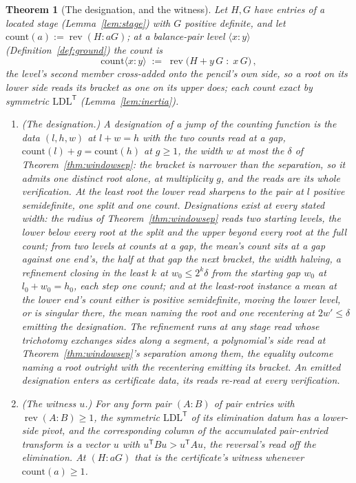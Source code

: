\documentclass[11pt]{article}
\newtheorem{theorem}{Theorem}
\theoremstyle{definition}
\begin{document}
\begin{theorem}[The designation, and the witness]
\label{thm:certconstruct}
Let $H,G$ have entries of a located stage
(Lemma~\ref{lem:stage}) with $G$ positive definite, and let $\mathrm{count}(a):=
\operatorname{rev}(H\!:\!aG)$; at a balance-pair level
$\langle x\!:\!y\rangle$ (Definition~\ref{def:ground}) the count is
\[
\mathrm{count}\langle x\!:\!y\rangle\;:=\;
\operatorname{rev}\big(H+y\,G\;:\;x\,G\big)\,,
\]
the level's second member cross-added onto the pencil's own side, so
a root on its lower side reads its bracket as one on its upper does; each
count exact by symmetric $\mathrm{LDL}^{\mathsf T}$
(Lemma~\ref{lem:inertia}).
\begin{enumerate}[leftmargin=2em,itemsep=1pt]
\item \emph{(The designation.)} A \emph{designation} of a jump of
the counting function is the data $(l,h,w)$ at $l+w=h$ with the two
counts read at a gap, $\mathrm{count}(l)+g=\mathrm{count}(h)$ at
$g\ge1$, the width $w$ at most the $\delta$ of
Theorem~\ref{thm:windowsep}: the bracket is narrower than the
separation, so it admits one distinct root alone, at multiplicity
$g$, and the reads are its whole verification. At the least root the
lower read sharpens to the pair at $l$ positive semidefinite, one
split and one count. Designations exist at every stated width: the
radius of Theorem~\ref{thm:windowsep} reads two starting levels, the
lower below every root at the split and the upper beyond every root
at the full count; from two levels at counts at a gap, the mean's
count sits at a gap against one end's, the half at that gap the next
bracket, the width halving, a refinement closing in the least $k$ at
$w_0\le2^k\delta$ from the starting gap $w_0$ at $l_0+w_0=h_0$,
each step one count; and at the least-root instance a mean at the
lower end's count either is positive semidefinite, moving the lower
level, or is singular there, the mean naming the root and one
recentering at
$2w'\le\delta$ emitting the designation. The refinement runs at any
stage read whose trichotomy exchanges sides along a segment, a
polynomial's side read at Theorem~\ref{thm:windowsep}'s separation
among them, the equality outcome naming a root outright with the
recentering emitting its bracket. An emitted designation enters as
certificate data, its reads re-read at every verification.
\item \emph{(The witness $u$.)} For \emph{any} form pair $(A\!:\!B)$ of pair
entries with $\operatorname{rev}(A\!:\!B)\ge1$, the symmetric $\mathrm{LDL}^{\mathsf T}$
of its elimination datum has a lower-side pivot, and the corresponding column of the accumulated
pair-entried transform is a vector $u$ with
$u^{\mathsf T}Bu>u^{\mathsf T}Au$, the reversal's read
off the elimination. At $(H\!:\!aG)$ that is the certificate's witness whenever
$\mathrm{count}(a)\ge1$.
\end{enumerate}
\end{theorem}
\end{document}
